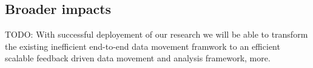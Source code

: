 \documentclass[11pt]{article}
\begin{document}








\subsection{Broader impacts}
TODO: With successful deployement of our research we will be able to transform the existing inefficient end-to-end data movement framwork to an efficient scalable feedback driven data movement and analysis framework, more.

\end{document}

